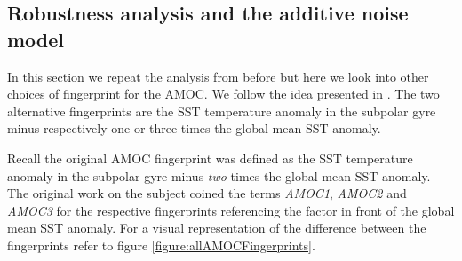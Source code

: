 \subsection{Robustness analysis and the additive noise model}
In this section we repeat the analysis from before but here we look into other choices of fingerprint for the AMOC. We follow the idea presented in \cite{Ditlevsen2023}. The two alternative fingerprints are the SST temperature anomaly in the subpolar gyre minus respectively one or three times the global mean SST anomaly.

Recall the original AMOC fingerprint was defined as the SST temperature anomaly in the subpolar gyre minus \textit{two} times the global mean SST anomaly. The original work on the subject coined the terms \textit{AMOC1}, \textit{AMOC2} and \textit{AMOC3} for the respective fingerprints referencing the factor in front of the global mean SST anomaly. For a visual representation of the difference between the fingerprints refer to figure \ref{figure:allAMOCFingerprints}.

